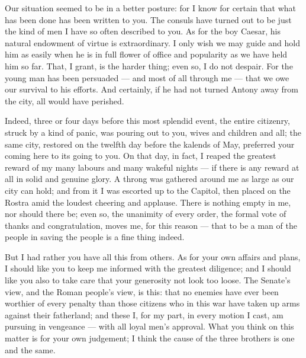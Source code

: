 

 Our situation seemed to be in a better posture: for I know for certain that what has been done has been written to you. The consuls have turned out to be just the kind of men I have so often described to you. As for the boy Caesar, his natural endowment of virtue is extraordinary. I only wish we may guide and hold him as easily when he is in full flower of office and popularity as we have held him so far. That, I grant, is the harder thing; even so, I do not despair. For the young man has been persuaded --- and most of all through me --- that we owe our survival to his efforts. And certainly, if he had not turned Antony away from the city, all would have perished.

 Indeed, three or four days before this most splendid event, the entire citizenry, struck by a kind of panic, was pouring out to you, wives and children and all; the same city, restored on the twelfth day before the kalends of May, preferred your coming here to its going to you. On that day, in fact, I reaped the greatest reward of my many labours and many wakeful nights --- if there is any reward at all in solid and genuine glory. A throng was gathered around me as large as our city can hold; and from it I was escorted up to the Capitol, then placed on the Rostra amid the loudest cheering and applause. There is nothing empty in me, nor should there be; even so, the unanimity of every order, the formal vote of thanks and congratulation, moves me, for this reason --- that to be a man of the people in saving the people is a fine thing indeed.

 But I had rather you have all this from others. As for your own affairs and plans, I should like you to keep me informed with the greatest diligence; and I should like you also to take care that your generosity not look too loose. The Senate's view, and the Roman people's view, is this: that no enemies have ever been worthier of every penalty than those citizens who in this war have taken up arms against their fatherland; and these I, for my part, in every motion I cast, am pursuing in vengeance --- with all loyal men's approval. What you think on this matter is for your own judgement; I think the cause of the three brothers is one and the same.
